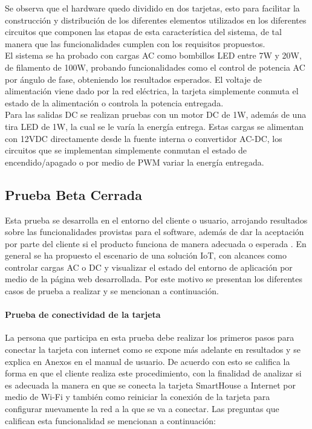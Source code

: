 Se observa que el hardware quedo dividido en dos tarjetas, esto para facilitar la construcción y distribución de los diferentes elementos utilizados en los diferentes circuitos que componen las etapas de esta característica del sistema, de tal manera que las funcionalidades cumplen con los requisitos propuestos.\\

El sistema se ha probado con cargas AC como bombillos LED entre 7W y 20W, de filamento de 100W, probando funcionalidades como el control de potencia AC por ángulo de fase, obteniendo los resultados esperados. El voltaje de alimentación viene dado por la red eléctrica, la tarjeta simplemente conmuta el estado de la alimentación o controla la potencia entregada.\\

Para las salidas DC se realizan pruebas con un motor DC de 1W, además de una tira LED de 1W, la cual se le varía la energía entrega. Estas cargas se alimentan con 12VDC directamente desde la fuente interna o convertidor AC-DC, los circuitos que se implementan simplemente conmutan el estado de encendido/apagado o por medio de PWM variar la energía entregada.\\


\subsection{Prueba Beta Cerrada}

Esta prueba se desarrolla en el entorno del cliente o usuario, arrojando resultados sobre las funcionalidades provistas para el software, además de dar la aceptación por parte del cliente si el producto funciona de manera adecuada o esperada \cite{PB}. En general se ha propuesto el escenario de una solución IoT, con alcances como controlar cargas AC o DC y visualizar el estado del entorno de aplicación por medio de la página web desarrollada. Por este motivo se presentan los diferentes casos de prueba a realizar y se mencionan a continuación.\\

\paragraph{Prueba de conectividad de la tarjeta} La persona que participa en esta prueba debe realizar los primeros pasos para conectar la tarjeta con internet como se expone más adelante en resultados y se explica en Anexos en el manual de usuario. De acuerdo con esto se califica la forma en que el cliente realiza este procedimiento, con la finalidad de analizar si es adecuada la manera en que se conecta la tarjeta SmartHouse a Internet por medio de Wi-Fi y también como reiniciar la conexión de la tarjeta para configurar nuevamente la red a la que se va a conectar. Las preguntas que califican esta funcionalidad se mencionan a continuación:

